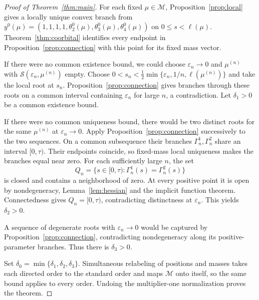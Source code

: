 \documentclass[11pt,a4paper]{article}
\numberwithin{equation}{section}
\theoremstyle{remark}
\newcommand{\M}{\mathcal M}
\newcommand{\eps}{\varepsilon}
\begin{document}
\begin{proof}[Proof of Theorem~\ref{thm:main}]
For each fixed $\mu\in\M$, Proposition~\ref{prop:local} gives a locally unique convex branch from
$y^0(\mu)=(1,1,1,1,\theta_2^0(\mu),\theta_3^0(\mu),\theta_4^0(\mu))$ on $0\le s<\ell(\mu)$.
Theorem~\ref{thm:coorbital} identifies every endpoint in Proposition~\ref{prop:connection} with this point for its fixed mass vector.

If there were no common existence bound, we could choose $\eps_n\to0$ and $\mu^{(n)}$ with $\mathcal S(\eps_n,\mu^{(n)})$ empty.
Choose $0<s_n<\frac12\min\{\eps_n,1/n,\ell(\mu^{(n)})\}$ and take the local root at $s_n$.
Proposition~\ref{prop:connection} gives branches through these roots on a common interval containing $\eps_n$ for large $n$, a contradiction. Let $\delta_1>0$ be a common existence bound.

If there were no common uniqueness bound, there would be two distinct roots for the same $\mu^{(n)}$ at $\eps_n\to0$.
Apply Proposition~\ref{prop:connection} successively to the two sequences. On a common subsequence their branches $\Gamma_n^1,\Gamma_n^2$ share an interval $[0,\tau)$.
Their endpoints coincide, so fixed-mass local uniqueness makes the branches equal near zero.
For each sufficiently large $n$, the set
\[
 Q_n=\{s\in[0,\tau):\Gamma_n^1(s)=\Gamma_n^2(s)\}
\]
is closed and contains a neighborhood of zero. At every positive point it is open by nondegeneracy, Lemma~\ref{lem:hessian} and the implicit function theorem.
Connectedness gives $Q_n=[0,\tau)$, contradicting distinctness at $\eps_n$. This yields $\delta_2>0$.

A sequence of degenerate roots with $\eps_n\to0$ would be captured by Proposition~\ref{prop:connection}, contradicting nondegeneracy along its positive-parameter branches. Thus there is $\delta_3>0$.

Set $\delta_0=\min\{\delta_1,\delta_2,\delta_3\}$.
Simultaneous relabeling of positions and masses takes each directed order to the standard order and maps $\M$ onto itself, so the same bound applies to every order.
Undoing the multiplier-one normalization proves the theorem.
\end{proof}
\end{document}
